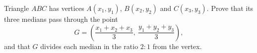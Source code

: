 Triangle $ABC$ has vertices $A(x_1,y_1)$, $B(x_2,y_2)$ and $C(x_3,y_3)$. Prove that its three medians pass through the point
\[G=\left(\dfrac{x_1+x_2+x_3}{3},\ \dfrac{y_1+y_2+y_3}{3}\right),\]
and that $G$ divides each median in the ratio $2:1$ from the vertex.
